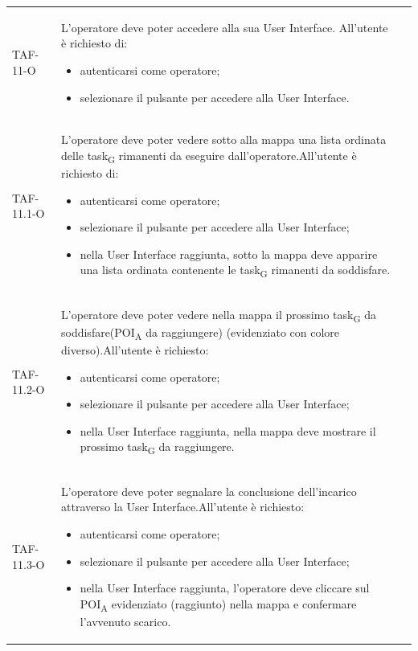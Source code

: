 \begin{longtable}{ >{\centering}p{} >{}p{}
		>{\centering}p{}}
	TAF-11-O & L'operatore deve poter accedere alla sua User Interface. All'utente è richiesto di: \begin{itemize} \item autenticarsi come operatore; \item selezionare il pulsante per accedere alla User Interface.\end{itemize} & 0\tabularnewline
	
	TAF-11.1-O & L'operatore deve poter vedere sotto alla mappa una lista ordinata delle \gls{task}\textsubscript{G} rimanenti da eseguire dall'operatore.\newline All'utente è richiesto di: \begin{itemize} \item autenticarsi come operatore; \item selezionare il pulsante per accedere alla User Interface; \item nella User Interface raggiunta, sotto la mappa deve apparire una lista ordinata contenente le \gls{task}\textsubscript{G} rimanenti da soddisfare.\end{itemize} & 0\tabularnewline
	
	TAF-11.2-O & L'operatore deve poter vedere nella mappa il prossimo \gls{task}\textsubscript{G} da soddisfare(\acrshort{POI}\textsubscript{A} da raggiungere) (evidenziato con colore diverso).\newline All'utente è richiesto: \begin{itemize} \item autenticarsi come operatore; \item selezionare il pulsante per accedere alla User Interface; \item nella User Interface raggiunta, nella mappa deve mostrare il prossimo \gls{task}\textsubscript{G} da raggiungere.\end{itemize} & 0\tabularnewline
	
	TAF-11.3-O & L'operatore deve poter segnalare la conclusione dell'incarico attraverso la User Interface.\newline All'utente è richiesto: \begin{itemize} \item autenticarsi come operatore; \item selezionare il pulsante per accedere alla User Interface; \item nella User Interface raggiunta, l'operatore deve cliccare sul \acrshort{POI}\textsubscript{A} evidenziato (raggiunto) nella mappa e confermare l'avvenuto scarico.\end{itemize} & 0\tabularnewline
	

\end{longtable}
